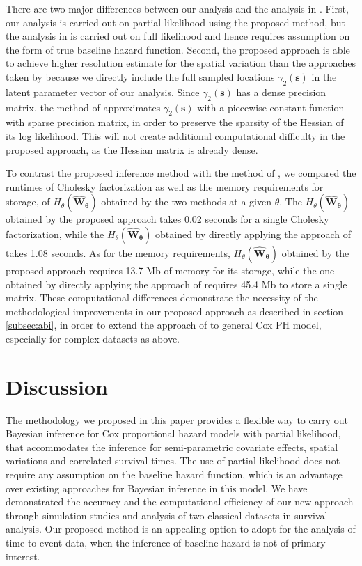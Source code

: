 \documentclass[ba]{imsart}
\begin{document}
There are two major differences between our analysis and the analysis in \cite{inlacoxph}. First, our analysis is carried out on partial likelihood using the proposed method, but the analysis in \cite{inlacoxph} is carried out on full likelihood and hence requires assumption on the form of true baseline hazard function. Second, the proposed approach is able to achieve higher resolution estimate for the spatial variation than the approaches taken by \cite{inlacoxph} because we directly include the full sampled locations $\gamma_2(\boldsymbol{s})$ in the latent parameter vector of our analysis. Since $\gamma_2(\boldsymbol{s})$ has a dense precision matrix, the method of \cite{inlacoxph} approximates $\gamma_2(\boldsymbol{s})$ with a piecewise constant function with sparse precision matrix, in order to preserve the sparsity of the Hessian of its log likelihood. This will not create additional computational difficulty in the proposed approach, as the Hessian matrix is already dense.

To contrast the proposed inference method with the method of \cite{casecross}, we compared the runtimes of Cholesky factorization as well as the memory requirements for storage, of $H_\theta(\boldsymbol{\widehat{W}_{\theta}})$ obtained by the two methods at a given $\theta$. The $H_\theta(\boldsymbol{\widehat{W}_{\theta}})$ obtained by the proposed approach takes 0.02 seconds for a single Cholesky factorization, while the $H_\theta(\boldsymbol{\widehat{W}_{\theta}})$ obtained by directly applying the approach of \cite{casecross} takes 1.08 seconds. As for the memory requirements, $H_\theta(\boldsymbol{\widehat{W}_{\theta}})$ obtained by the proposed approach requires 13.7 Mb of memory for its storage, while the one obtained by directly applying the approach of \cite{casecross} requires 45.4 Mb to store a single matrix. These computational differences demonstrate the necessity of the methodological improvements in our proposed approach as described in section \ref{subsec:abi}, in order to extend the approach of \cite{casecross} to general Cox PH model, especially for complex datasets as above.

\section{Discussion}\label{sec:discussion}


The methodology we proposed in this paper provides a flexible way to carry out Bayesian inference for Cox proportional hazard models with partial likelihood, that accommodates the inference for semi-parametric covariate effects, spatial variations and correlated survival times. The use of partial likelihood does not require any assumption on the baseline hazard function, which is an advantage over existing approaches for Bayesian inference in this model. We have demonstrated the accuracy and the computational efficiency of our new approach through simulation studies and analysis of two classical datasets in survival analysis. Our proposed method is an appealing option to adopt for the analysis of time-to-event data, when the inference of baseline hazard is not of primary interest.
\end{document}
